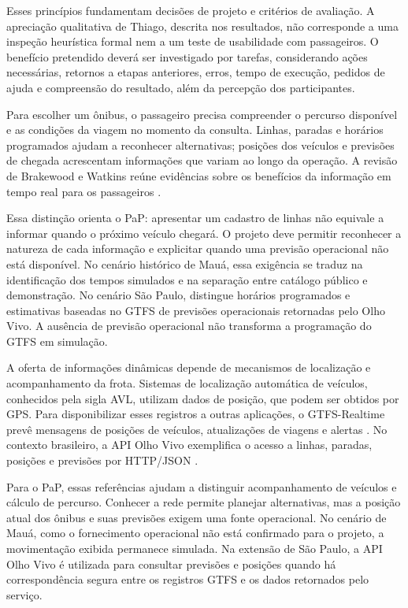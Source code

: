 \documentclass[12pt,oneside,a4paper,brazil,chapter=TITLE]{abntex2}
\begin{document}
Esses princípios fundamentam decisões de projeto e critérios de avaliação. A apreciação qualitativa de Thiago, descrita nos resultados, não corresponde a uma inspeção heurística formal nem a um teste de usabilidade com passageiros. O benefício pretendido deverá ser investigado por tarefas, considerando ações necessárias, retornos a etapas anteriores, erros, tempo de execução, pedidos de ajuda e compreensão do resultado, além da percepção dos participantes.

Para escolher um ônibus, o passageiro precisa compreender o percurso disponível e as condições da viagem no momento da consulta. Linhas, paradas e horários programados ajudam a reconhecer alternativas; posições dos veículos e previsões de chegada acrescentam informações que variam ao longo da operação. A revisão de Brakewood e Watkins reúne evidências sobre os benefícios da informação em tempo real para os passageiros \citep{brakewood2019}.

Essa distinção orienta o PaP: apresentar um cadastro de linhas não equivale a informar quando o próximo veículo chegará. O projeto deve permitir reconhecer a natureza de cada informação e explicitar quando uma previsão operacional não está disponível. No cenário histórico de Mauá, essa exigência se traduz na identificação dos tempos simulados e na separação entre catálogo público e demonstração. No cenário São Paulo, distingue horários programados e estimativas baseadas no GTFS de previsões operacionais retornadas pelo Olho Vivo. A ausência de previsão operacional não transforma a programação do GTFS em simulação.

A oferta de informações dinâmicas depende de mecanismos de localização e acompanhamento da frota. Sistemas de localização automática de veículos, conhecidos pela sigla AVL, utilizam dados de posição, que podem ser obtidos por GPS. Para disponibilizar esses registros a outras aplicações, o GTFS-Realtime prevê mensagens de posições de veículos, atualizações de viagens e alertas \citep{gtfs}. No contexto brasileiro, a API Olho Vivo exemplifica o acesso a linhas, paradas, posições e previsões por HTTP/JSON \citep{sptransapi}.

Para o PaP, essas referências ajudam a distinguir acompanhamento de veículos e cálculo de percurso. Conhecer a rede permite planejar alternativas, mas a posição atual dos ônibus e suas previsões exigem uma fonte operacional. No cenário de Mauá, como o fornecimento operacional não está confirmado para o projeto, a movimentação exibida permanece simulada. Na extensão de São Paulo, a API Olho Vivo é utilizada para consultar previsões e posições quando há correspondência segura entre os registros GTFS e os dados retornados pelo serviço.
\end{document}
